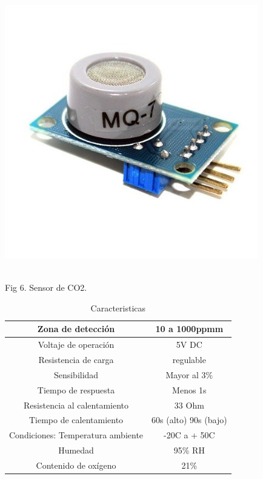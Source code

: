 \documentclass[12pt]{report}
\begin{document}
\begin{center}
\includegraphics[scale=0.98]{Documento/Figuras/fig7.jpg}
\begin{scriptsize}\\ 
Fig 6. Sensor de CO2.
\end{scriptsize}
\end{center}

\begin{table}[h]
\caption{Caracteristicas}
\begin{center}
\begin{tabular}{|c|c|}
\hline
Zona de detección & 10 a 1000ppmm
\\ \hline
Voltaje de operación & 5V DC \\ \hline
Resistencia de carga & regulable \\ \hline
Sensibilidad &  Mayor al 3\% \\ \hline
Tiempo de respuesta	& Menos 1s \\ \hline
Resistencia al calentamiento & 33 Ohm \\ \hline
Tiempo de calentamiento & 60s (alto) 90s (bajo) \\ \hline
Condiciones: Temperatura ambiente	& -20C a + 50C \\ \hline
Humedad & 95\% RH \\ \hline
Contenido de oxígeno & 21\% \\ \hline
\end{tabular}
\end{center}
\end{table}
\end{document}
